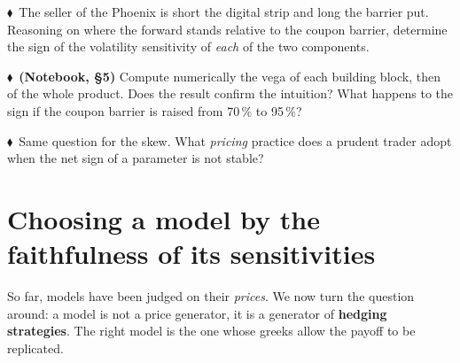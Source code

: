 \documentclass[11pt,a4paper]{article}
\newcommand{\indiv}{\textcolor{indivred}{$\blacklozenge$}}
\begin{document}
\begin{questions}[resume]
  \item \indiv\ The seller of the Phoenix is short the digital strip and long the barrier put. Reasoning on
  where the forward stands relative to the coupon barrier, determine the sign of the volatility
  sensitivity of \emph{each} of the two components.

  \item \indiv\ \textbf{(Notebook, \S5)} Compute numerically the vega of each building block, then of the whole
  product. Does the result confirm the intuition? What happens to the sign if the coupon barrier
  is raised from 70\,\% to 95\,\%?

  \item \indiv\ Same question for the skew. What \emph{pricing} practice does a prudent trader adopt when the net
  sign of a parameter is not stable?
\end{questions}

\section{Choosing a model by the faithfulness of its sensitivities}

So far, models have been judged on their \emph{prices}. We now turn the question around: a model is not
a price generator, it is a generator of \textbf{hedging strategies}. The right model is the one whose greeks
allow the payoff to be replicated.
\end{document}
